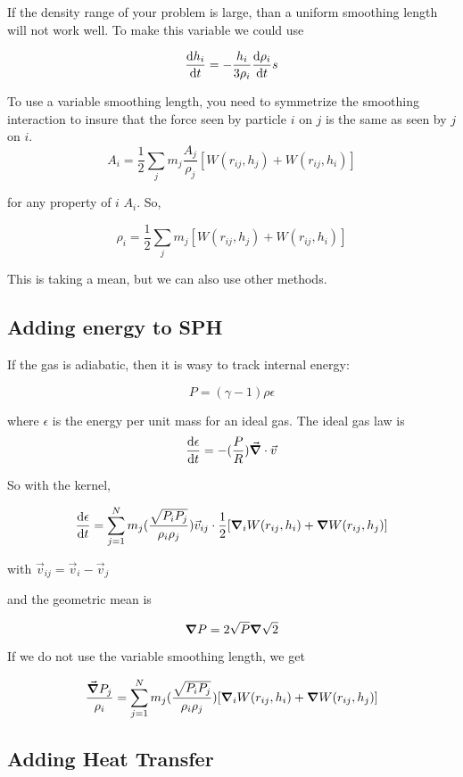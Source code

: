 \documentclass[]{article}
\begin{document}
If the density range of your problem is large, than a uniform smoothing length will not work well. To make this variable we could use

\[\dv{h_i}{t} = -\frac{h_i}{3\rho_i} \dv{\rho_i}{t}s\]


To use a variable smoothing length, you need to symmetrize the smoothing interaction to insure that the force seen by particle $i$ on $j$ is the same as seen by $j$ on $i$. \\

\[A_i = \frac{1}{2} \sum_{j} m_j \frac{A_j}{\rho_j} [W(r_{ij}, h_j) + W(r_{ij}, h_i)]\]

for any property of $i$ $A_i$. So,

\[\rho_i = \frac{1}{2} \sum_{j} m_j [W(r_{ij}, h_j) + W(r_{ij}, h_i)]\]

This is taking a mean, but we can also use other methods.\\

\subsection{Adding energy to SPH}\bigbreak

If the gas is adiabatic, then it is wasy to track internal energy:

\[P = (\gamma - 1)\rho\epsilon\]

where $\epsilon$ is the energy per unit mass for an ideal gas. The ideal gas law is\\

\[\dv{\epsilon}{t} = -(\frac{P}{R}) \vec{\grad}\cdot{\vec{v}}\]

So with the kernel,

\[\dv{\epsilon}{t} = \sum_{j=1}^N m_j (\frac{\sqrt{P_iP_j}}{\rho_i\rho_j})\vec{v}_{ij} \cdot \frac{1}{2}[\grad_i{W(r_{ij}, h_i)} + \grad{W(r_{ij}, h_j)}]\]


with $\vec{v}_{ij} = \vec{v}_i - \vec{v}_j$ 

and the geometric mean is

\[\grad{P} = 2\sqrt{P} \grad \sqrt{2}\]


If we do not use the variable smoothing length, we get

\[\frac{\vec{\grad}{P_j}}{\rho_i} = \sum_{j=1}^N m_j (\frac{\sqrt{P_iP_j}}{\rho_i\rho_j})[\grad_i{W(r_{ij}, h_i)} + \grad{W(r_{ij}, h_j)}]\]

\subsection{Adding Heat Transfer}\bigbreak
\end{document}
